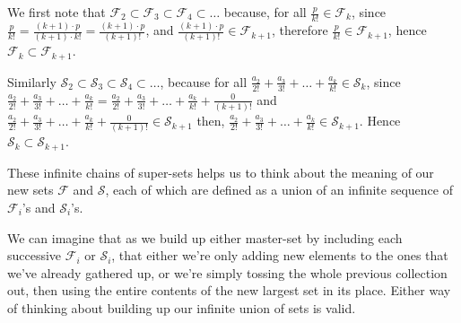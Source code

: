 \documentclass{article}
\begin{document}
We first note that
\(\mathcal{F}_2
\subset \mathcal{F}_3
\subset \mathcal{F}_4
\subset \dots{}\) because,
for all \(\frac{p}{k!} \in \mathcal{F}_k\),
since \(\frac{p}{k!} = \frac{(k+1)\cdot{}p}{(k+1)\cdot{}k!} = \frac{(k+1)\cdot{}p}{(k+1)!}\),
and \(\frac{(k+1)\cdot{}p}{(k+1)!} \in \mathcal{F}_{k+1}\),
therefore \(\frac{p}{k!} \in \mathcal{F}_{k+1}\),
hence \(\mathcal{F}_k \subset \mathcal{F}_{k+1}\).



Similarly
\(\mathcal{S}_2
\subset \mathcal{S}_3
\subset \mathcal{S}_4
\subset \dots{}\), because
for all \(\frac{a_2}{2!}\!+\!\frac{a_3}{3!}\!+\!\dots{}\!+\!\frac{a_k}{k!} \in \mathcal{S}_k\),
since\newline
\(\frac{a_2}{2!}\!+\!\frac{a_3}{3!}\!+\!\dots{}\!+\!\frac{a_k}{k!} =
\frac{a_2}{2!}\!+\!\frac{a_3}{3!}\!+\!\dots{}\!+\!\frac{a_k}{k!}\!+\!\frac{0}{(k+1)!}\)
and
\(\frac{a_2}{2!}\!+\!\frac{a_3}{3!}\!+\!\dots{}\!+\!\frac{a_k}{k!}\!+\!\frac{0}{(k+1)!}
\in \mathcal{S}_{k+1}\) then,\newline
\(\frac{a_2}{2!}\!+\!\frac{a_3}{3!}\!+\!\dots{}\!+\!\frac{a_k}{k!}
\in \mathcal{S}_{k+1}\). Hence 
\(\mathcal{S}_k \subset \mathcal{S}_{k+1}\).


These infinite chains of super-sets helps us to think about the
meaning of our new sets
\(\mathcal{F}\) and \(\mathcal{S}\), each of which are defined as a union of 
an infinite sequence of \(\mathcal{F}_i\)'s and \(\mathcal{S}_i\)'s.

We can imagine that as
we build up either master-set by including each successive
\(\mathcal{F}_i\) or \(\mathcal{S}_i\), that either we're only adding
new elements to the ones that we've already gathered up, or we're simply tossing
the whole previous collection out, then using the entire contents of
the new largest set in its place. Either way of thinking about
building up our infinite union of sets is valid.
\end{document}

